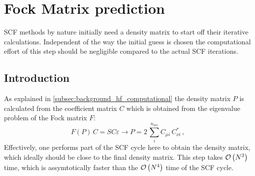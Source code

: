 \chapter{Fock Matrix prediction}
\label{chap:fock_matrix_predictions}

SCF methods by nature initially need a density matrix to start off their iterative calculations. Independent of the way the initial guess is chosen the computational effort of this step should be negligible compared to the actual SCF iterations. 

\section{Introduction}
\label{sec:Fock_mathcalrix_prediction_intro}
As explained in \autoref{subsec:background_hf_computational} the density matrix $P$ is calculated from the coefficient matrix $C$ which is obtained from the eigenvalue problem of the Fock matrix $F$:
\begin{equation}
    \label{eq:density_reconstruction_from_fock}
    F(P)\,C = SC\varepsilon \rightarrow P = 2\,\sum_{i}^{n_{occ}} C_{\mu i}\,C^*_{\nu i}\,,%
\end{equation}
Effectively, one performs part of the SCF cycle here to obtain the density matrix, which ideally should be close to the final density matrix. This step takes $\mathcal{O}\left(N^3\right)$ time, which is assymtotically faster than the $\mathcal{O}\left(N^4\right)$ time of the SCF cycle. 


